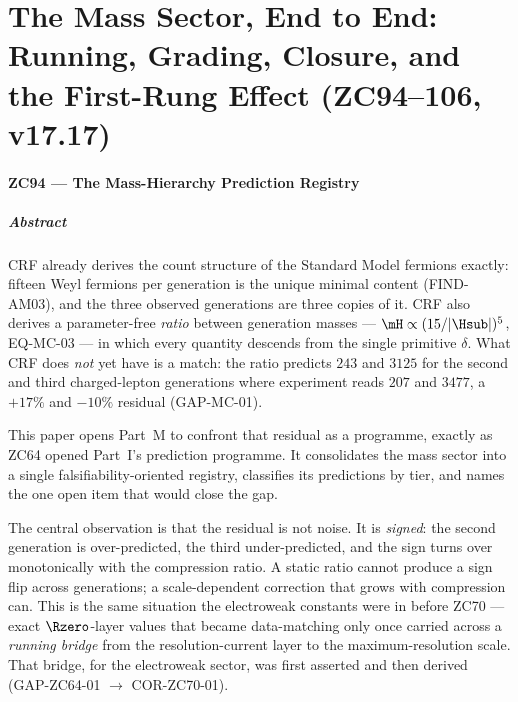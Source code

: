 \documentclass[12pt, a4paper]{article}
\begin{document}
\newpage

\part{The Mass Sector, End to End: Running, Grading, Closure, and the First-Rung Effect (ZC94--106, v17.17)}


\subsection{ZC94 --- The Mass-Hierarchy Prediction Registry}
\subsubsection*{Abstract}
\sloppy
CRF already derives the count structure of the Standard Model fermions
exactly: fifteen Weyl fermions per generation is the unique minimal content
(FIND-AM03), and the three observed generations are three copies of it. CRF
also derives a parameter-free \emph{ratio} between generation masses ---
$\mH\propto(15/|\Hsub|)^{5}$, EQ-MC-03 --- in which every quantity descends
from the single primitive $\delta$. What CRF does \emph{not} yet have is a
match: the ratio predicts $243$ and $3125$ for the second and third
charged-lepton generations where experiment reads $207$ and $3477$, a
$+17\%$ and $-10\%$ residual (GAP-MC-01).

This paper opens Part~M to confront that residual as a programme, exactly as
ZC64 opened Part~I's prediction programme. It consolidates the mass sector
into a single falsifiability-oriented registry, classifies its predictions by
tier, and names the one open item that would close the gap.

The central observation is that the residual is not noise. It is
\emph{signed}: the second generation is over-predicted, the third
under-predicted, and the sign turns over monotonically with the compression
ratio. A static ratio cannot produce a sign flip across generations; a
scale-dependent correction that grows with compression can. This is the same
situation the electroweak constants were in before ZC70 --- exact
$\Rzero$-layer values that became data-matching only once carried across a
\emph{running bridge} from the resolution-current layer to the
maximum-resolution scale. That bridge, for the electroweak sector, was first
asserted and then derived (GAP-ZC64-01 $\to$ COR-ZC70-01).
\end{document}
